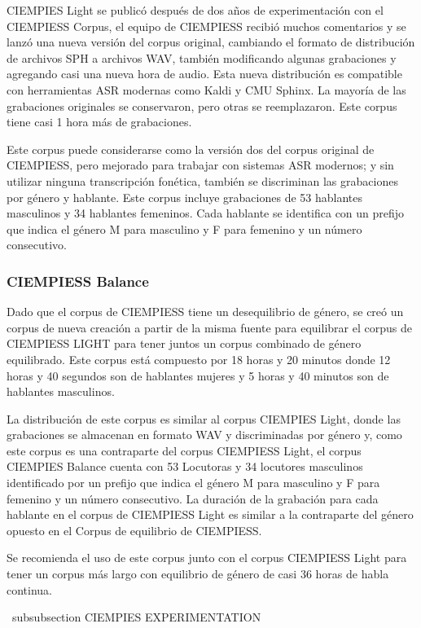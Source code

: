 \documentclass[a4paper,12pt,twoside]{report}
\begin{document}
CIEMPIES Light se publicó después de dos años de experimentación con el CIEMPIESS Corpus, el equipo de CIEMPIESS recibió muchos comentarios y se lanzó una nueva versión del corpus original, cambiando el formato de distribución de archivos SPH a archivos WAV, también modificando algunas grabaciones y agregando casi una nueva hora de audio. Esta nueva distribución es compatible con herramientas ASR modernas como Kaldi y CMU Sphinx. La mayoría de las grabaciones originales se conservaron, pero otras se reemplazaron. Este corpus tiene casi 1 hora más de grabaciones.

Este corpus puede considerarse como la versión dos del corpus original de CIEMPIESS, pero mejorado para trabajar con sistemas ASR modernos; y sin utilizar ninguna transcripción fonética, también se discriminan las grabaciones por género y hablante. Este corpus incluye grabaciones de 53 hablantes masculinos y 34 hablantes femeninos. Cada hablante se identifica con un prefijo que indica el género M para masculino y F para femenino y un número consecutivo.

\subsubsection{CIEMPIESS Balance}

Dado que el corpus de CIEMPIESS tiene un desequilibrio de género, se creó un corpus de nueva creación a partir de la misma fuente para equilibrar el corpus de CIEMPIESS LIGHT para tener juntos un corpus combinado de género equilibrado. Este corpus está compuesto por 18 horas y 20 minutos donde 12 horas y 40 segundos son de hablantes mujeres y 5 horas y 40 minutos son de hablantes masculinos.

La distribución de este corpus es similar al corpus CIEMPIES Light, donde las grabaciones se almacenan en formato WAV y discriminadas por género y, como este corpus es una contraparte del corpus CIEMPIESS Light, el corpus CIEMPIES Balance cuenta con 53 Locutoras y 34 locutores masculinos identificado por un prefijo que indica el género M para masculino y F para femenino y un número consecutivo. La duración de la grabación para cada hablante en el corpus de CIEMPIESS Light es similar a la contraparte del género opuesto en el Corpus de equilibrio de CIEMPIESS.

Se recomienda el uso de este corpus junto con el corpus CIEMPIESS Light para tener un corpus más largo con equilibrio de género de casi 36 horas de habla continua.

\ subsubsection {CIEMPIES EXPERIMENTATION }
\end{document}
